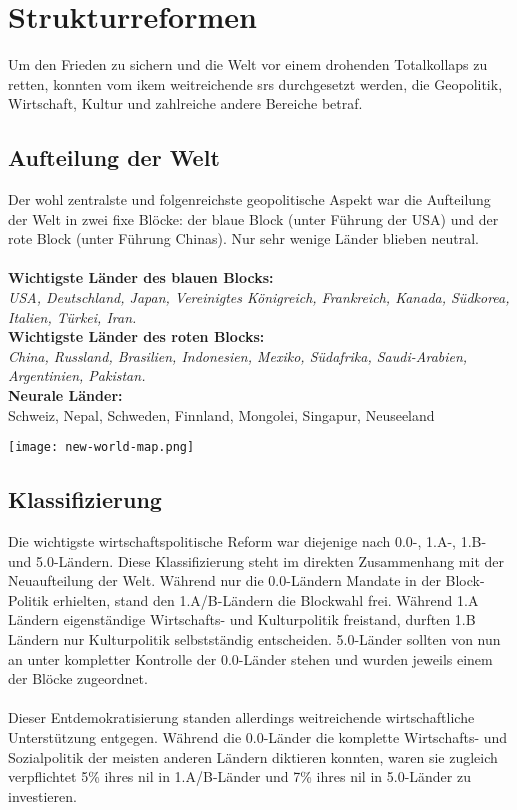 \section{Strukturreformen} 
Um den Frieden zu sichern und die Welt vor einem drohenden Totalkollaps zu
retten, konnten vom \ac{ikem} weitreichende \ac{sr}s durchgesetzt werden, die
Geopolitik, Wirtschaft, Kultur und zahlreiche andere Bereiche betraf. 

\subsection{Aufteilung der Welt} 
Der wohl zentralste und folgenreichste geopolitische Aspekt war die Aufteilung
der Welt in zwei fixe Blöcke: der blaue Block (unter Führung der USA) und der
rote Block (unter Führung Chinas). Nur sehr wenige Länder blieben neutral.\\\\
%
\textbf{Wichtigste Länder des blauen Blocks:}\\
\emph{USA, Deutschland, Japan, Vereinigtes Königreich, Frankreich, Kanada, Südkorea,
Italien, Türkei, Iran.}\\
\textbf{Wichtigste Länder des roten Blocks:}\\
\emph{China, Russland, Brasilien, Indonesien, Mexiko, Südafrika, Saudi-Arabien,
Argentinien, Pakistan.}\\
\textbf{Neurale Länder:}\\ 
Schweiz, Nepal, Schweden, Finnland, Mongolei, Singapur, Neuseeland

\begin{center}
  \texttt{[image: new-world-map.png]}%
\end{center}


\subsection{Klassifizierung}
Die wichtigste wirtschaftspolitische Reform war diejenige nach 0.0-, 1.A-, 1.B-
und 5.0-Ländern.
Diese Klassifizierung steht im direkten Zusammenhang mit der Neuaufteilung
der Welt. 
Während nur die 0.0-Ländern Mandate in der Block-Politik erhielten, stand den
1.A/B-Ländern die Blockwahl frei. Während 1.A Ländern eigenständige
Wirtschafts- und Kulturpolitik freistand, durften 1.B Ländern nur Kulturpolitik
selbstständig entscheiden. 5.0-Länder sollten von nun an unter kompletter
Kontrolle der 0.0-Länder stehen und wurden jeweils einem der Blöcke
zugeordnet.\\\\
% 
Dieser Entdemokratisierung standen allerdings weitreichende wirtschaftliche
Unterstützung entgegen. Während die 0.0-Länder die komplette Wirtschafts- und
Sozialpolitik der meisten anderen Ländern diktieren konnten, waren sie zugleich
verpflichtet 5\% ihres \ac{nil} in 1.A/B-Länder und 7\% ihres \ac{nil} in
5.0-Länder zu investieren. 

